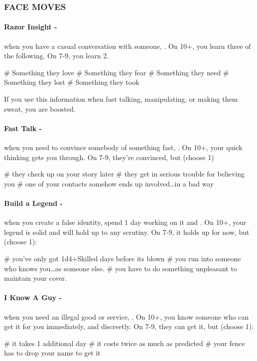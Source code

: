 \subsubsection{FACE MOVES}
\paragraph{Razor Insight -} when you have a casual conversation with someone, . On 10+, you learn three of the following. On 7-9, you learn 2.
    \begin{easylist}
        # Something they love        
        # Something they fear        
        # Something they need        
        # Something they lost        
        # Something they took
    \end{easylist}
If you use this information when fast talking, manipulating, or making them sweat, you are boosted.

\paragraph{Fast Talk -} when you need to convince somebody of something fast, . On 10+, your quick thinking gets you through. On 7-9, they’re convinced, but (choose 1)
    \begin{easylist}
        # they check up on your story later
        # they get in serious trouble for believing you
        # one of your contacts somehow ends up involved…in a bad way   
    \end{easylist}
        
\paragraph{Build a Legend -} when you create a false identity, spend 1 day working on it and . On 10+, your legend is solid and will hold up to any scrutiny. On 7-9, it holds up for now, but (choose 1):
    \begin{easylist}
        # you've only got 1d4+Skilled days before its blown
        # you run into someone who knows you…as someone else.
        # you have to do something unpleasant to maintain your cover.
    \end{easylist}

\paragraph{I Know A Guy -} when you need an illegal good or service, . On 10+, you know someone who can get it for you immediately, and discreetly. On 7-9, they can get it, but (choose 1):
    \begin{easylist}
        # it takes 1 additional day
        # it costs twice as much as predicted
        # your fence has to drop your name to get it
    \end{easylist}

